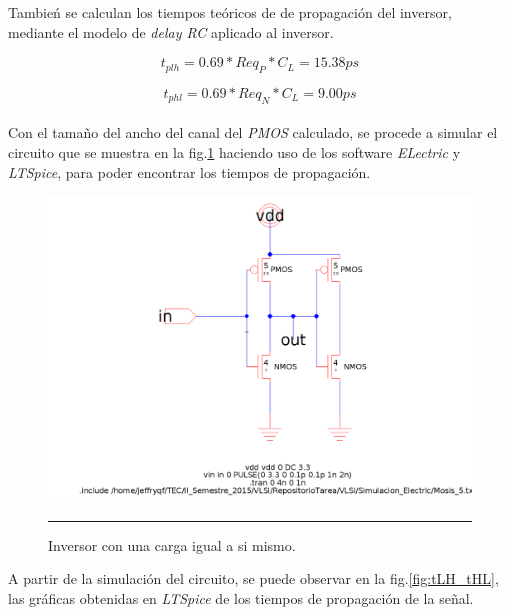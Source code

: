 \documentclass[12pt,a4paper]{article} %
\begin{document}
Tambień se calculan los tiempos teóricos de de propagación del inversor, mediante el modelo de \textit{delay RC} aplicado al inversor.

\begin{equation}\label{eqn:DelayRC2}
t_{plh} = 0.69*Req_P*C_L = 15.38ps
\end{equation}

\begin{equation}\label{eqn:DelayRC}
t_{phl} = 0.69*Req_N*C_L = 9.00ps
\end{equation}\\

Con el tamaño del ancho del canal del \textit{PMOS} calculado, se procede a simular el circuito que se muestra en la fig.\ref{fig:Inversor_1b} haciendo uso de los software \textit{ELectric} y \textit{LTSpice}, para poder encontrar los tiempos de propagación.\\

\begin{figure}[htbp]
  \centering
    \includegraphics[scale=0.25]{./Inversor_estatico_1b.png}
    \rule{35em}{0.3pt}
  \caption[INV]{Inversor con una carga igual a si mismo.}
  \label{fig:Inversor_1b}
\end{figure}

A partir de la simulación del circuito, se puede observar en la fig.\ref{fig:tLH_tHL}, las gráficas obtenidas en \textit{LTSpice} de los tiempos de propagación de la señal.\\
\end{document}
